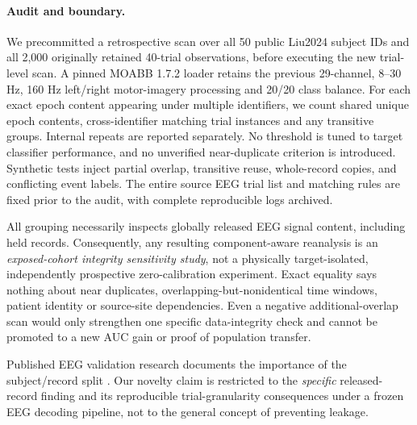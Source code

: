 \paragraph{Audit and boundary.}
We precommitted a retrospective scan over all 50 public
Liu2024 subject IDs and all 2,000 originally retained
40-trial observations, before executing the new trial-level
scan. A pinned MOABB 1.7.2 loader retains the previous
29-channel, 8--30 Hz, 160 Hz left/right motor-imagery
processing and 20/20 class balance. For each exact epoch
content appearing under multiple identifiers, we count
shared unique epoch contents, cross-identifier matching
trial instances and any transitive groups. Internal repeats
are reported separately. No threshold is tuned to target
classifier performance, and no unverified near-duplicate
criterion is introduced. Synthetic tests inject
partial overlap, transitive reuse, whole-record copies,
and conflicting event labels. The entire source EEG
trial list and matching rules are fixed prior to the
audit, with complete reproducible logs archived.

All grouping necessarily inspects globally released
EEG signal content, including held records. Consequently,
any resulting component-aware reanalysis is an
\emph{exposed-cohort integrity sensitivity study},
not a physically target-isolated, independently
prospective zero-calibration experiment.
Exact equality says nothing about near duplicates,
overlapping-but-nonidentical time windows, patient
identity or source-site dependencies. Even a negative
additional-overlap scan would only strengthen one
specific data-integrity check and cannot be promoted
to a new AUC gain or proof of population transfer.

Published EEG validation research documents
the importance of the subject/record split
\cite{gil2026subjectvalidation}. Our novelty claim
is restricted to the \emph{specific} released-record
finding and its reproducible trial-granularity
consequences under a frozen EEG decoding pipeline,
not to the general concept of preventing leakage.
